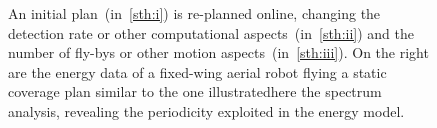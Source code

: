 \documentclass[letterpaper,10pt,conference,twoside]{IEEEtran}
\newcommand{\figpath}{./figures}
\theoremstyle{definition}
\begin{document}
\begin{figure}[t]
  \centering
  \vspace*{-5ex}
        {\color{black}\scriptsize }
  \vspace*{.6ex}
  \caption{%
  An initial plan~(in~\ref{sth:i}) {\color{black}is} re-planned online, changing the %
  detection rate or other computational aspects~(in~\ref{sth:ii}) and %
  the number of fly-bys or other motion aspects~(in~\ref{sth:iii}). 
  {\color{black}On the right} %
  {\color{black}are} the energy data of a %
  fixed-wing aerial robot flying a static coverage plan similar to the one illustrated\hspace*{.5ex}here%
  the spectrum analysis, %
  revealing the periodicity %
  exploited in the %
  energy model.
  }
  \label{fig:il-abs}
  \vspace*{-3.8ex}
\end{figure}
\end{document}
